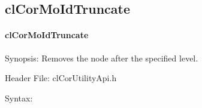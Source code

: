 \begin{flushleft}
\subsection{clCorMoIdTruncate}
\hypertarget{pagecor115}{}\paragraph{cl\-Cor\-MoId\-Truncate}\label{pagecor115}
\begin{Desc}
\item[Synopsis:]Removes the node after the specified level.\end{Desc}
\begin{Desc}
\item[Header File:]clCorUtilityApi.h\end{Desc}
\begin{Desc}
\item[Syntax:]


\end{Desc}
\end{flushleft}
